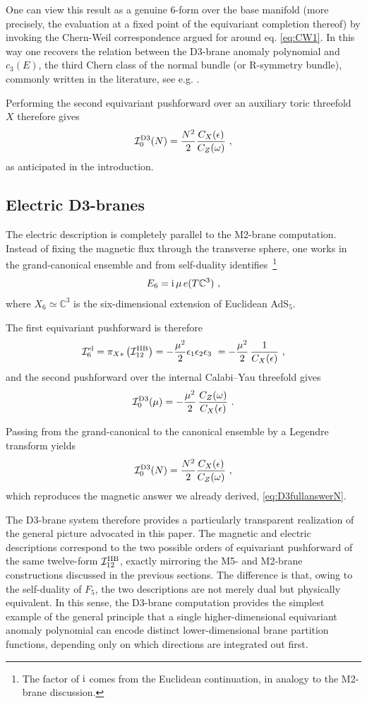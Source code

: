 \documentclass[11pt,a4paper]{article}
\def\cI{{\cal I}}
\def\i{{\rm i}}
\theoremstyle{definition}
\theoremstyle{identity}
\theoremstyle{remark}
\newcommand{\be}{\begin{equation}}
\newcommand{\ee}{\end{equation}}
\newcommand{\e}{\epsilon}
\newcommand{\BC}{\mathbb{C}}
\begin{document}
One can view this result as a genuine 6-form over the base manifold (more precisely, the evaluation at a fixed point of the equivariant completion thereof) by invoking the Chern-Weil correspondence argued for around eq. \eqref{eq:CW1}. In this way one recovers the relation between the D3-brane anomaly polynomial and $c_3(E)$, the third Chern class of the normal bundle (or R-symmetry bundle), commonly written in the literature, see e.g. \cite{Bah:2020jas}.

Performing the second equivariant pushforward over an auxiliary toric
threefold $X$ therefore gives
\be
\label{eq:D3fullanswerN}
\cI_0^{\rm D3}(N)
=
\frac{N^2}{2}
\frac{C_X(\e)}{C_Z (\omega)}\ ,
\ee
as anticipated in the introduction.



\subsection{Electric D3-branes}

The electric description is completely parallel to the M2-brane computation. Instead of fixing
the magnetic flux through the transverse sphere, one works in the grand-canonical ensemble and from self-duality
identifies~\footnote{The factor of $\i$ comes from the Euclidean continuation, in analogy to the M2-brane discussion.}
\be
E_6
= \i\,
\mu\,e(T \BC^3)\ ,
\ee
where $X_6\simeq\mathbb C^3$ is the six-dimensional extension of Euclidean AdS$_5$.

The first equivariant pushforward is therefore
\be
\label{I_6^el}
\cI_6^{\rm el}
=
\pi_{X*}
\left( \cI_{12}^{\rm IIB} \right)
=
-\frac{\mu^2}{2}
\e_1\e_2\e_3\ = -\frac{\mu^2}{2}\,  \frac{1}{C_X (\e)}\ ,
\ee
and the second pushforward over the internal Calabi--Yau threefold gives
\be\label{eq:D3eCYpf}
\cI_0^{\rm D3}(\mu)
=
- \frac{\mu^2}{2}\, \frac{C_Z (\omega)}{C_X(\e)}\ .
\ee

Passing from the grand-canonical to the canonical ensemble by a Legendre transform yields
\be\label{Laplace_D3}
\cI_0^{\rm D3}(N)
=
\frac{N^2}{2}
\frac{C_X(\e)}{C_Z (\omega)}\ ,
\ee
which reproduces the magnetic answer we already derived, \eqref{eq:D3fullanswerN}.


The D3-brane system therefore provides a particularly transparent realization of the general
picture advocated in this paper. The magnetic and electric descriptions correspond to the two
possible orders of equivariant pushforward of the same twelve-form
$\cI_{12}^{\rm IIB}$, exactly mirroring the M5- and M2-brane constructions discussed in the
previous sections. The difference is that, owing to the self-duality of $F_5$, the two
descriptions are not merely dual but physically equivalent. In this sense, the D3-brane
computation provides the simplest example of the general principle that a single
higher-dimensional equivariant anomaly polynomial can encode distinct lower-dimensional brane
partition functions, depending only on which directions are integrated out first.
\end{document}
